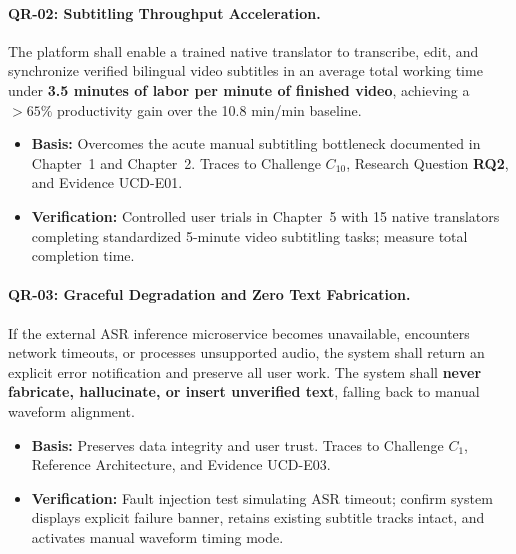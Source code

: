 \documentclass[conference]{IEEEtran}
\begin{document}
\paragraph{QR-02: Subtitling Throughput Acceleration.}
The platform shall enable a trained native translator to transcribe, edit, and synchronize verified bilingual video subtitles in an average total working time under \textbf{3.5 minutes of labor per minute of finished video}, achieving a $>65\%$ productivity gain over the 10.8 min/min baseline.
\begin{itemize}
    \item \textbf{Basis:} Overcomes the acute manual subtitling bottleneck documented in Chapter~1 and Chapter~2. Traces to Challenge $C_{10}$, Research Question \textbf{RQ2}, and Evidence UCD-E01.
    \item \textbf{Verification:} Controlled user trials in Chapter~5 with 15 native translators completing standardized 5-minute video subtitling tasks; measure total completion time.
\end{itemize}

\paragraph{QR-03: Graceful Degradation and Zero Text Fabrication.}
If the external ASR inference microservice becomes unavailable, encounters network timeouts, or processes unsupported audio, the system shall return an explicit error notification and preserve all user work. The system shall \textbf{never fabricate, hallucinate, or insert unverified text}, falling back to manual waveform alignment.
\begin{itemize}
    \item \textbf{Basis:} Preserves data integrity and user trust. Traces to Challenge $C_1$, Reference Architecture, and Evidence UCD-E03.
    \item \textbf{Verification:} Fault injection test simulating ASR timeout; confirm system displays explicit failure banner, retains existing subtitle tracks intact, and activates manual waveform timing mode.
\end{itemize}
\end{document}
